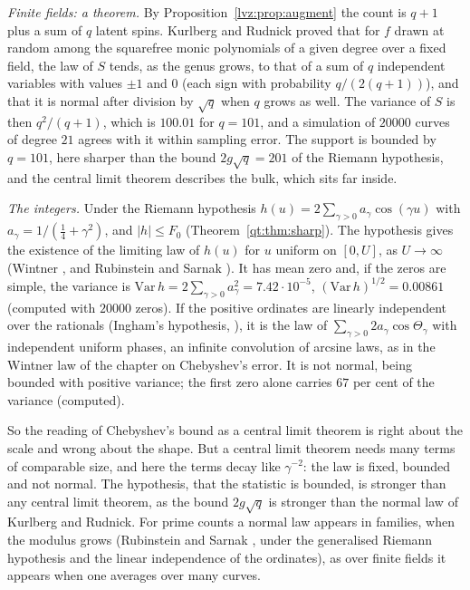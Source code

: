 \emph{Finite fields: a theorem.} By Proposition~\ref{lvz:prop:augment} the count is $q+1$ plus a sum of $q$ latent spins. Kurlberg and Rudnick \cite{KurlbergRudnick09} proved that for $f$ drawn at random among the squarefree monic polynomials of a given degree over a fixed field, the law of $S$ tends, as the genus grows, to that of a sum of $q$ independent variables with values $\pm1$ and $0$ (each sign with probability $q/(2(q+1))$), and that it is normal after division by $\sqrt q$ when $q$ grows as well. The variance of $S$ is then $q^2/(q+1)$, which is $100.01$ for $q=101$, and a simulation of $20000$ curves of degree $21$ agrees with it within sampling error. The support is bounded by $q=101$, here sharper than the bound $2g\sqrt q=201$ of the Riemann hypothesis, and the central limit theorem describes the bulk, which sits far inside.

\emph{The integers.} Under the Riemann hypothesis $h(u)=2\sum_{\gamma>0}a_\gamma\cos(\gamma u)$ with $a_\gamma=1/(\frac14+\gamma^2)$, and $|h|\le F_0$ (Theorem~\ref{qt:thm:sharp}). The hypothesis gives the existence of the limiting law of $h(u)$ for $u$ uniform on $[0,U]$, as $U\to\infty$ (Wintner \cite{Wintner35}, and Rubinstein and Sarnak \cite{RubinsteinSarnak94}). It has mean zero and, if the zeros are simple, the variance is $\mathrm{Var}\,h=2\sum_{\gamma>0}a_\gamma^2=7.42\cdot10^{-5}$, $(\mathrm{Var}\,h)^{1/2}=0.00861$ (computed with $20000$ zeros). If the positive ordinates are linearly independent over the rationals (Ingham's hypothesis, \cite{Ingham42}), it is the law of $\sum_{\gamma>0}2a_\gamma\cos\Theta_\gamma$ with independent uniform phases, an infinite convolution of arcsine laws, as in the Wintner law of the chapter on Chebyshev's error. It is not normal, being bounded with positive variance; the first zero alone carries $67$ per cent of the variance (computed).

So the reading of Chebyshev's bound as a central limit theorem is right about the scale and wrong about the shape. But a central limit theorem needs many terms of comparable size, and here the terms decay like $\gamma^{-2}$: the law is fixed, bounded and not normal. The hypothesis, that the statistic is bounded, is stronger than any central limit theorem, as the bound $2g\sqrt q$ is stronger than the normal law of Kurlberg and Rudnick. For prime counts a normal law appears in families, when the modulus grows (Rubinstein and Sarnak \cite{RubinsteinSarnak94}, under the generalised Riemann hypothesis and the linear independence of the ordinates), as over finite fields it appears when one averages over many curves.

